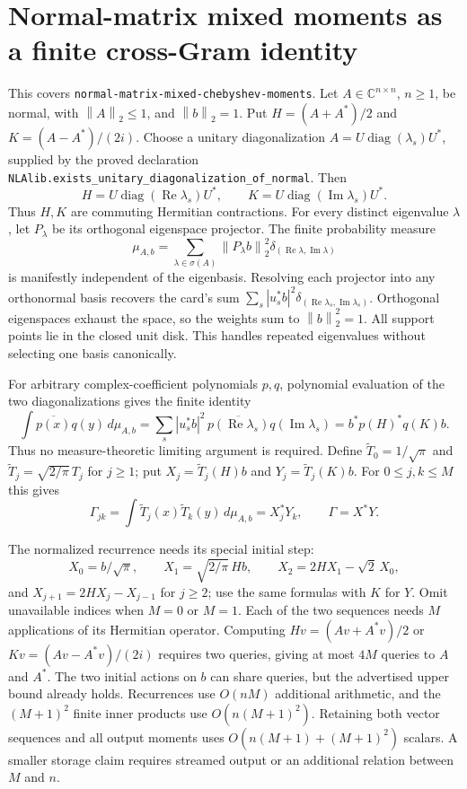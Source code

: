 \documentclass[11pt,a4paper]{article}
\newcommand{\C}{\mathbb C}
\newcommand{\norm}[1]{\left\lVert#1\right\rVert}
\DeclareMathOperator{\diag}{diag}
\DeclareRobustCommand{\code}[1]{{\footnotesize\urlstyle{tt}\nolinkurl{#1}}}
\begin{document}
\section{Normal-matrix mixed moments as a finite cross-Gram identity}
\label{sec:ns-mixedmoments}

This covers \code{normal-matrix-mixed-chebyshev-moments}. Let
$A\in\C^{n\times n}$, $n\ge1$, be normal, with $\norm A_2\le1$,
and $\norm b_2=1$. Put $H=(A+A^*)/2$ and $K=(A-A^*)/(2i)$.
Choose a unitary diagonalization
$A=U\diag(\lambda_s)U^*$, supplied by the proved declaration
\code{NLAlib.exists_unitary_diagonalization_of_normal}. Then
\[
 H=U\diag(\operatorname{Re}\lambda_s)U^*,\qquad
 K=U\diag(\operatorname{Im}\lambda_s)U^*.
\]
Thus $H,K$ are commuting Hermitian contractions. For every distinct
eigenvalue $\lambda$, let $P_\lambda$ be its orthogonal eigenspace
projector. The finite probability measure
\[
 \mu_{A,b}=\sum_{\lambda\in\sigma(A)}
       \norm{P_\lambda b}_2^2
       \delta_{(\operatorname{Re}\lambda,\operatorname{Im}\lambda)}
\]
is manifestly independent of the eigenbasis. Resolving each projector
into any orthonormal basis recovers the card's sum
$\sum_s|u_s^*b|^2\delta_{(\operatorname{Re}\lambda_s,
\operatorname{Im}\lambda_s)}$. Orthogonal eigenspaces exhaust the
space, so the weights sum to $\norm b_2^2=1$. All support points lie in
the closed unit disk. This handles repeated eigenvalues without selecting
one basis canonically.

For arbitrary complex-coefficient polynomials $p,q$, polynomial
evaluation of the two diagonalizations gives the finite identity
\[
 \int\overline{p(x)}q(y)\,d\mu_{A,b}
 =\sum_s |u_s^*b|^2\,
     \overline{p(\operatorname{Re}\lambda_s)}
                  q(\operatorname{Im}\lambda_s)
 =b^*p(H)^*q(K)b.
\]
Thus no measure-theoretic limiting argument is required. Define
$\widetilde T_0=1/\sqrt\pi$ and
$\widetilde T_j=\sqrt{2/\pi}\,T_j$ for $j\ge1$; put
$X_j=\widetilde T_j(H)b$ and $Y_j=\widetilde T_j(K)b$.
For $0\le j,k\le M$ this gives
\[
 \Gamma_{jk}=\int\widetilde T_j(x)\widetilde T_k(y)\,d\mu_{A,b}
            =X_j^*Y_k,\qquad \Gamma=X^*Y.
\]

The normalized recurrence needs its special initial step:
\[
 X_0=b/\sqrt\pi,\qquad X_1=\sqrt{2/\pi}\,Hb,
 \qquad X_2=2HX_1-\sqrt2\,X_0,
\]
and $X_{j+1}=2HX_j-X_{j-1}$ for $j\ge2$; use the same formulas with
$K$ for $Y$. Omit unavailable indices when $M=0$ or $M=1$.
Each of the two sequences needs $M$ applications of its Hermitian
operator. Computing $Hv=(Av+A^*v)/2$ or
$Kv=(Av-A^*v)/(2i)$ requires two queries, giving at most $4M$ queries to
$A$ and $A^*$. The two initial actions on $b$ can share queries, but the
advertised upper bound already holds. Recurrences use $O(nM)$ additional
arithmetic, and the $(M+1)^2$ finite inner products use
$O(n(M+1)^2)$. Retaining both vector sequences and all output moments
uses $O(n(M+1)+(M+1)^2)$ scalars. A smaller storage claim requires streamed
output or an additional relation between $M$ and $n$.
\end{document}
